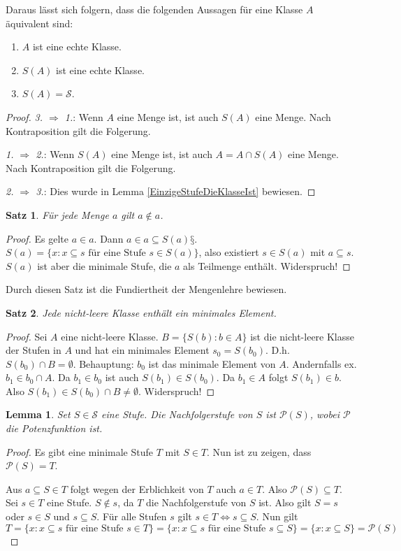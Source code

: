 \documentclass[german]{article}
\theoremstyle{break}
\theoremstyle{def_style}
\theoremstyle{def_style}
\newtheorem{satz}{Satz}[section]
\theoremstyle{lemma_style}
\newtheorem{lemma}{Lemma}[subsection]
\newcommand{\Pot}[1]{\mathcal{P}(#1)}
\begin{document}
Daraus lässt sich folgern, dass die folgenden Aussagen für eine Klasse $A$ äquivalent sind:
\begin{enumerate}
	\item $A$ ist eine echte Klasse.
	\item $S(A)$ ist eine echte Klasse.
	\item $S(A)=\mathcal{S}$.
\end{enumerate}
\begin{proof}
	\textit{3. $\Rightarrow$ 1.}: Wenn $A$ eine Menge ist, ist auch $S(A)$ eine Menge. Nach Kontraposition gilt die Folgerung.
	
	\textit{1. $\Rightarrow$ 2.}: Wenn $S(A)$ eine Menge ist, ist auch $A=A\cap S(A)$ eine Menge. Nach Kontraposition gilt die Folgerung.
	
	\textit{2. $\Rightarrow$ 3.}: Dies wurde in Lemma \ref{EinzigeStufeDieKlasseIst} bewiesen.
\end{proof}

\begin{satz}
	Für jede Menge $a$ gilt $a\notin a$.
\end{satz}
\begin{proof}
	Es gelte $a\in a$. Dann $a\in a \subseteq S(a)§$. $S(a)=\{x : x\subseteq s \text{ für eine Stufe } s\in S(a)\}$, also existiert $s\in S(a)$ mit $a\subseteq s$. $S(a)$ ist aber die minimale Stufe, die $a$ als Teilmenge enthält. Widerspruch!
\end{proof}

Durch diesen Satz ist die Fundiertheit der Mengenlehre bewiesen.

\begin{satz}
	Jede nicht-leere Klasse enthält ein minimales Element.
\end{satz}
\begin{proof}
	Sei $A$ eine nicht-leere Klasse. $B=\{S(b) : b \in A\}$ ist die nicht-leere Klasse der Stufen in $A$ und hat ein minimales Element $s_0=S(b_0)$. D.h. $S(b_0)\cap B = \emptyset$. 
	Behauptung: $b_0$ ist das minimale Element von $A$. Andernfalls ex. $b_1\in b_0\cap A$. Da $b_1 \in b_0$ ist auch $S(b_1)\in S(b_0)$. Da $b_1\in A$ folgt $S(b_1)\in b$. Also $S(b_1)\in S(b_0)\cap B \neq \emptyset$. Widerspruch!
\end{proof}

\begin{lemma}
	Set $S\in \mathcal{S}$ eine Stufe. Die Nachfolgerstufe von $S$ ist $\Pot{S}$, wobei $\mathcal{P}$ die Potenzfunktion ist.
\end{lemma}
\begin{proof}
	Es gibt eine minimale Stufe $T$ mit $S\in T$. Nun ist zu zeigen, dass $\Pot{S}=T$.
	
	Aus $a\subseteq S\in T$ folgt wegen der Erblichkeit von $T$ auch $a\in T$. Also $\Pot{S}\subseteq T$. Sei $s \in T$ eine Stufe. $S\notin s$, da $T$ die Nachfolgerstufe von $S$ ist. Also gilt $S=s$ oder $s\in S$ und $s\subseteq S$. Für alle Stufen $s$ gilt $s\in T \Leftrightarrow s\subseteq S$. Nun gilt $T=\{x : x\subseteq s \text{ für eine Stufe } s\in T\}=\{x : x \subseteq s \text{ für eine Stufe } s\subseteq S\}=\{x : x \subseteq S\}=\Pot{S}$
\end{proof}
\end{document}
